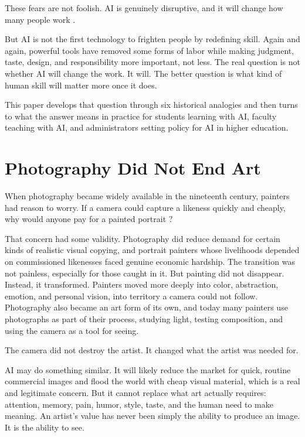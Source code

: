 \documentclass[12pt]{article}
\begin{document}
These fears are not foolish. AI is genuinely disruptive, and it will change how many people work \citep{frey2017future, acemoglu2019automation}.

But AI is not the first technology to frighten people by redefining skill. Again and again, powerful tools have removed some forms of labor while making judgment, taste, design, and responsibility more important, not less. The real question is not whether AI will change the work. It will. The better question is what kind of human skill will matter more once it does.

This paper develops that question through six historical analogies and then turns to what the answer means in practice for students learning with AI, faculty teaching with AI, and administrators setting policy for AI in higher education.

\section{Photography Did Not End Art}

When photography became widely available in the nineteenth century, painters had reason to worry. If a camera could capture a likeness quickly and cheaply, why would anyone pay for a painted portrait \citep{newhall1982history}?

That concern had some validity. Photography did reduce demand for certain kinds of realistic visual copying, and portrait painters whose livelihoods depended on commissioned likenesses faced genuine economic hardship. The transition was not painless, especially for those caught in it. But painting did not disappear. Instead, it transformed. Painters moved more deeply into color, abstraction, emotion, and personal vision, into territory a camera could not follow. Photography also became an art form of its own, and today many painters use photographs as part of their process, studying light, testing composition, and using the camera as a tool for seeing.

The camera did not destroy the artist. It changed what the artist was needed for.

AI may do something similar. It will likely reduce the market for quick, routine commercial images and flood the world with cheap visual material, which is a real and legitimate concern. But it cannot replace what art actually requires: attention, memory, pain, humor, style, taste, and the human need to make meaning. An artist's value has never been simply the ability to produce an image. It is the ability to see.
\end{document}

